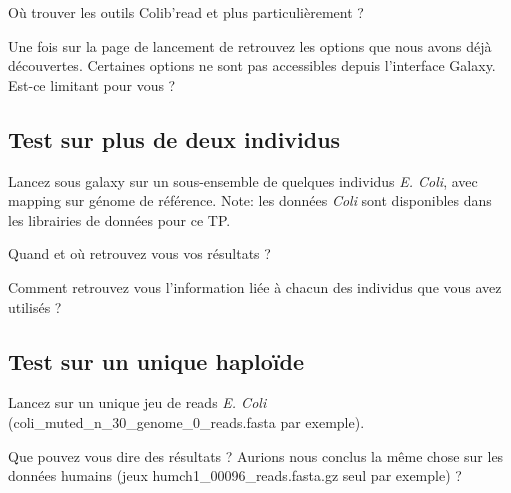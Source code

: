 \qu {} Où trouver les outils Colib'read et plus particulièrement \discopp ?

\qu Une fois sur la page de lancement de \discopp retrouvez les options que nous avons déjà découvertes. Certaines options ne sont pas accessibles depuis l'interface Galaxy. Est-ce limitant pour vous ?

\subsection*{Test sur plus de deux individus}

\qu {} Lancez sous galaxy \discopp sur un sous-ensemble de quelques individus \emph{E. Coli}, avec mapping sur génome de référence. Note: les données \emph{Coli} sont disponibles dans les librairies de données pour ce TP. 

\qu Quand et où retrouvez vous vos résultats ?

\qu Comment retrouvez vous l'information liée à chacun des individus que vous avez utilisés ? 


\subsection*{Test sur un unique haploïde}
\qu {} Lancez \discopp sur un unique jeu de reads \emph{E. Coli} (coli\_muted\_n\_30\_genome\_0\_reads.fasta par exemple).

\qu Que pouvez vous dire des résultats ? Aurions nous conclus la même chose sur les données humains (jeux humch1\_00096\_reads.fasta.gz seul par exemple) ?





